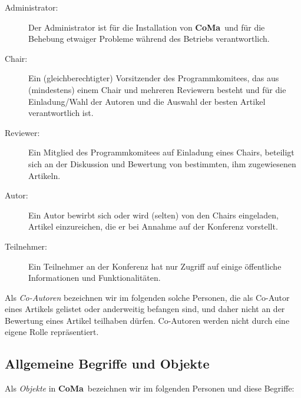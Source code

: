 \documentclass[headexclude,footexclude,12pt,BCOR0pt,DIV15]{scrartcl}
\newcommand{\CoMa}{\textbf{CoMa}}
\begin{document}
        \begin{description}
            \item[Administrator:] Der Administrator ist f\"{u}r die Installation von \CoMa\ und f\"{u}r
                die Behebung etwaiger Probleme w\"{a}hrend des Betriebs verantwortlich.

            \item[Chair:] Ein (gleichberechtigter) Vorsitzender des Programmkomitees, das aus (mindestens)
                einem Chair und mehreren Reviewern besteht und f\"{u}r die Einladung/Wahl der Autoren und die
                Auswahl der besten Artikel verantwortlich ist.

            \item[Reviewer:] Ein Mitglied des Programmkomitees auf Einladung eines Chairs, beteiligt sich
                an der Diskussion und Bewertung von bestimmten, ihm zugewiesenen Artikeln.

            \item[Autor:] Ein Autor bewirbt sich oder wird (selten) von den Chairs eingeladen, Artikel einzureichen,
                die er bei Annahme auf der Konferenz vorstellt.

            \item[Teilnehmer:] Ein Teilnehmer an der Konferenz hat nur Zugriff auf einige \"{o}ffentliche Informationen
                und Funktionalit\"{a}ten.

        \end{description}

        Als \emph{Co-Autoren} bezeichnen wir im folgenden solche Personen, die als Co-Autor eines Artikels
        gelistet oder anderweitig befangen sind, und daher nicht an der Bewertung eines Artikel teilhaben d\"{u}rfen.
        Co-Autoren werden nicht durch eine eigene Rolle repr\"{a}sentiert.

    \subsection{Allgemeine Begriffe und Objekte}

        Als \emph{Objekte} in \CoMa\ bezeichnen wir im folgenden Personen und diese Begriffe:
\end{document}
